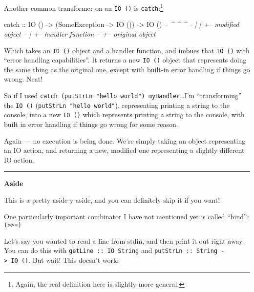 \documentclass[]{article}
\newenvironment{Shaded}{}{}
\newcommand{\DataTypeTok}[1]{\textcolor[rgb]{0.56,0.13,0.00}{{#1}}}
\newcommand{\CommentTok}[1]{\textcolor[rgb]{0.38,0.63,0.69}{\textit{{#1}}}}
\newcommand{\OtherTok}[1]{\textcolor[rgb]{0.00,0.44,0.13}{{#1}}}
\newcommand{\NormalTok}[1]{{#1}}
\begin{document}
Another common transformer on an \texttt{IO\ ()} is \texttt{catch}:\footnote{Again,
  the real definition here is slightly more general.}

\begin{Shaded}
\begin{Highlighting}[]
\NormalTok{catch}\OtherTok{ ::} \DataTypeTok{IO} \NormalTok{() }\OtherTok{->} \NormalTok{(}\DataTypeTok{SomeException} \OtherTok{->} \DataTypeTok{IO} \NormalTok{()) }\OtherTok{->} \DataTypeTok{IO} \NormalTok{()}
\CommentTok{--       ^         ^                          ^}
\CommentTok{--       |         |                          +-- modified object}
\CommentTok{--       |         +-- handler function}
\CommentTok{--       +-- original object}
\end{Highlighting}
\end{Shaded}

Which takes an \texttt{IO\ ()} object and a handler function, and imbues that
\texttt{IO\ ()} with ``error handling capabilities''. It returns a new
\texttt{IO\ ()} object that represents doing the same thing as the original one,
except with built-in error handling if things go wrong. Neat!

So if I used \texttt{catch\ (putStrLn\ "hello\ world")\ myHandler}\ldots{}I'm
``transforming'' the \texttt{IO\ ()} (\texttt{putStrLn\ "hello\ world"}),
representing printing a string to the console, into a new \texttt{IO\ ()} which
represents printing a string to the console, with built in error handling if
things go wrong for some reason.

Again --- no execution is being done. We're simply taking an object representing
an IO action, and returning a new, modified one representing a slightly
different IO action.

\begin{center}\rule{0.5\linewidth}{\linethickness}\end{center}

\textbf{Aside}

This is a pretty aside-y aside, and you can definitely skip it if you want!

One particularly important combinator I have not mentioned yet is called
``bind'': \texttt{(\textgreater{}\textgreater{}=)}

Let's say you wanted to read a line from stdin, and then print it out right
away. You can do this with \texttt{getLine\ ::\ IO\ String} and
\texttt{putStrLn\ ::\ String\ -\textgreater{}\ IO\ ()}. But wait! This doesn't
work:
\end{document}
